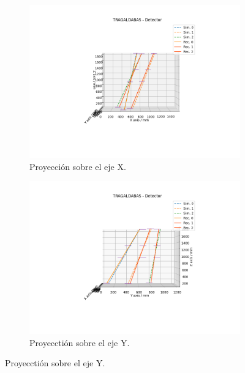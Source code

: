\documentclass[a4paper]{article}
\begin{document}
\begin{figure}[H]  %
  \begin{subfigure}[b]{0.5\linewidth}
    \centering
    \includegraphics[trim={4cm 3cm 3.9cm 1.9cm},clip,width=\linewidth]  {tragaldabas_xproj.png} 
    \caption{Proyección sobre el eje X.} 
    \label{fg:3-a} 
  \end{subfigure}%
  \begin{subfigure}[b]{0.5\linewidth}
    \centering
    \includegraphics[trim={4cm 3cm 3.9cm 1.9cm},clip,width=\linewidth]  {tragaldabas_yproj.png} 
    \caption{Proyecctión sobre el eje Y.} 
    \label{fg:3-b} 
  \end{subfigure} 

\end{figure}
\end{document}
